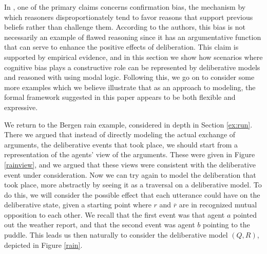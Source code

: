 \documentclass[greybox]{svmult}
\renewcommand{\bar}[1]{\overline{#1}}
\begin{document}
In \cite{mercier}, one of the primary claims concerns confirmation bias, the mechanism by which reasoners disproportionately tend to favor reasons that support previous beliefs rather than challenge them. According to the authors, this bias is not necessarily an example of flawed reasoning since it has an argumentative function that can serve to enhance the positive effects of deliberation. This claim is supported by empirical evidence, and in this section we show how scenarios where cognitive bias plays a constructive role can be represented by deliberative models and reasoned with using modal logic. Following this, we go on to consider some more examples which we believe illustrate that as an approach to modeling, the formal framework suggested in this paper appears to be both flexible and expressive. 

\begin{example}
We return to the Bergen rain example, considered in depth in Section \ref{ex:run}. There we argued that instead of directly modeling the actual exchange of arguments, the deliberative events that took place, we should start from a representation of the agents' view of the arguments. These were given in Figure \ref{rainview}, and we argued that these views were consistent with the deliberative event under consideration. Now we can try again to model the deliberation that took place, more abstractly by seeing it as a traversal on a deliberative model. To do this, we will consider the possible effect that each utterance could have on the deliberative state, given a starting point where $r$ and $\overline r$ are in recognized mutual opposition to each other. We recall that the first event was that agent $a$ pointed out the weather report, and that the second event was agent $b$ pointing to the puddle. This leads us then naturally to consider the deliberative model $(Q,R)$, depicted in Figure \ref{rain}.
\end{example}
\end{document}
